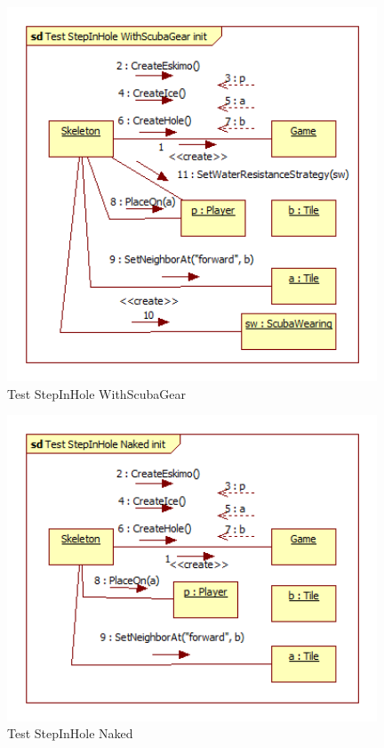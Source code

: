 \begin{figure}[H]
	\begin{center}
		\includegraphics[width=11cm]{chapters/chapter05/diagrams/Test_StepInHole_WithScubaGear_init.png}
		\caption{Test StepInHole WithScubaGear}
		\label{fig:Test StepInHole WithScubaGear}
	\end{center}
\end{figure}

\begin{figure}[H]
	\begin{center}
		\includegraphics[width=11cm]{chapters/chapter05/diagrams/Test_StepInHole_Naked_init.png}
		\caption{Test StepInHole Naked}
		\label{fig:Test StepInHole Naked}
	\end{center}
\end{figure}

